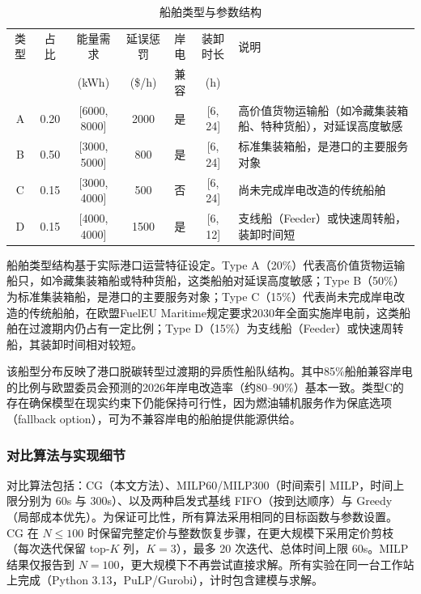 \documentclass[UTF8, a4paper, 12pt]{ctexart}
\theoremstyle{plain}
\theoremstyle{definition}
\theoremstyle{remark}
\begin{document}
\begin{table}[htbp]
    \centering
    \caption{船舶类型与参数结构}
    \label{tab:ship_types}
    \scriptsize
    \renewcommand{\arraystretch}{1.3}
    \begin{threeparttable}
    \begin{tabular}{c c c c c c p{4cm}}
        \toprule
        类型 & 占比 & 能量需求 & 延误惩罚 & 岸电 & 装卸时长 & 说明 \\
        & & (kWh) & (\$/h) & 兼容 & (h) & \\
        \midrule
        A & 0.20 & [6000, 8000] & 2000 & 是 & [6, 24] & 高价值货物运输船（如冷藏集装箱船、特种货船），对延误高度敏感 \\
        \addlinespace
        B & 0.50 & [3000, 5000] & 800 & 是 & [6, 24] & 标准集装箱船，是港口的主要服务对象 \\
        \addlinespace
        C & 0.15 & [3000, 4000] & 500 & 否 & [6, 24] & 尚未完成岸电改造的传统船舶 \\
        \addlinespace
        D & 0.15 & [4000, 4000] & 1500 & 是 & [6, 12] & 支线船（Feeder）或快速周转船，装卸时间短 \\
        \bottomrule
    \end{tabular}
    \end{threeparttable}
\end{table}

船舶类型结构基于实际港口运营特征设定。Type A（20\%）代表高价值货物运输船只，如冷藏集装箱船或特种货船，这类船舶对延误高度敏感；Type B（50\%）为标准集装箱船，是港口的主要服务对象；Type C（15\%）代表尚未完成岸电改造的传统船舶，在欧盟FuelEU Maritime规定\cite{EU2025}要求2030年全面实施岸电前，这类船舶在过渡期内仍占有一定比例；Type D（15\%）为支线船（Feeder）或快速周转船，其装卸时间相对较短。

该船型分布反映了港口脱碳转型过渡期的异质性船队结构。其中85\%船舶兼容岸电的比例与欧盟委员会预测的2026年岸电改造率（约80--90\%）基本一致。类型C的存在确保模型在现实约束下仍能保持可行性，因为燃油辅机服务作为保底选项（fallback option），可为不兼容岸电的船舶提供能源供给。

\subsubsection{对比算法与实现细节}
\label{sec:baselines_impl}
对比算法包括：CG（本文方法）、MILP60/MILP300（时间索引 MILP，时间上限分别为 60s 与 300s）、以及两种启发式基线 FIFO（按到达顺序）与 Greedy（局部成本优先）。为保证可比性，所有算法采用相同的目标函数与参数设置。CG 在 $N\le 100$ 时保留完整定价与整数恢复步骤，在更大规模下采用定价剪枝（每次迭代保留 top-$K$ 列，$K=3$），最多 20 次迭代、总体时间上限 60s。MILP 结果仅报告到 $N=100$，更大规模下不再尝试直接求解。所有实验在同一台工作站上完成（Python 3.13，PuLP/Gurobi），计时包含建模与求解。
\end{document}

